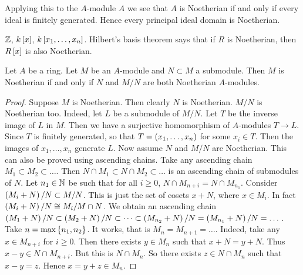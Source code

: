 \begin{remark}
Applying this to the $ A $-module $ A $ we see that $ A $ is Noetherian if and only if every ideal is finitely generated. Hence every principal ideal domain is Noetherian.
\end{remark}

\begin{example*}
$ \Z $, $ k\sb{x} $, $ k\sb{x_1, \dots, x_n} $. Hilbert's basis theorem says that if $ R $ is Noetherian, then $ R\sb{x} $ is also Noetherian.
\end{example*}

\begin{proposition}
\label{prop:10.4}
Let $ A $ be a ring. Let $ M $ be an $ A $-module and $ N \subset M $ a submodule. Then $ M $ is Noetherian if and only if $ N $ and $ M / N $ are both Noetherian $ A $-modules.
\end{proposition}

\begin{proof}
Suppose $ M $ is Noetherian. Then clearly $ N $ is Noetherian. $ M / N $ is Noetherian too. Indeed, let $ L $ be a submodule of $ M / N $. Let $ T $ be the inverse image of $ L $ in $ M $. Then we have a surjective homomorphism of $ A $-modules $ T \to L $. Since $ T $ is finitely generated, so that $ T = \rb{x_1, \dots, x_n} $ for some $ x_i \in T $. Then the images of $ x_1, \dots, x_n $ generate $ L $. Now assume $ N $ and $ M / N $ are Noetherian. This can also be proved using ascending chains. Take any ascending chain $ M_1 \subset M_2 \subset \dots $. Then $ N \cap M_1 \subset N \cap M_2 \subset \dots $ is an ascending chain of submodules of $ N $. Let $ n_1 \in \N $ be such that for all $ i \ge 0 $, $ N \cap M_{n + i} = N \cap M_{n_1} $. Consider $ \rb{M_i + N} / N \subset M / N $. This is just the set of cosets $ x + N $, where $ x \in M_i $. In fact $ \rb{M_i + N} / N \cong M_i / M \cap N $. We obtain an ascending chain $ \rb{M_1 + N} / N \subset \rb{M_2 + N} / N \subset \dots \subset \rb{M_{n_2} + N} / N = \rb{M_{n_1} + N} / N = \dots $. Take $ n = \max\cb{n_1, n_2} $. It works, that is $ M_n = M_{n + 1} = \dots $. Indeed, take any $ x \in M_{n + i} $ for $ i \ge 0 $. Then there exists $ y \in M_n $ such that $ x + N = y + N $. Thus $ x - y \in N \cap M_{n + i} $. But this is $ N \cap M_n $. So there exists $ z \in N \cap M_n $ such that $ x - y = z $. Hence $ x = y + z \in M_n $.
\end{proof}


